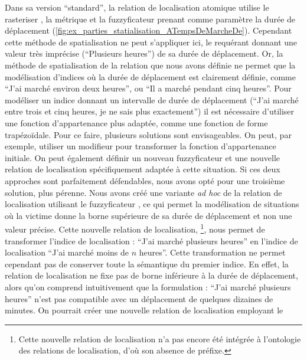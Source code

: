 Dans sa version \enquote{standard}, la relation de localisation
atomique  utilise le rasteriser
, la métrique  et la
fuzzyficateur  prenant comme paramètre la durée de
déplacement
(\autoref{fig:ex_parties_statialisation_ATempsDeMarcheDe}). Cependant
cette méthode de spatialisation ne peut s'appliquer ici, le requérant
donnant une valeur très imprécise (\ie \enquote{Plusieurs heures}) de
sa durée de déplacement. Or, la méthode de spatialisation de la
relation  que nous avons définie
ne permet que la modélisation d'indices où la durée de déplacement est
clairement définie, comme \enquote{J'ai marché environ deux heures},
ou \enquote{Il a marché pendant cinq heures}. Pour modéliser un indice
donnant un intervalle de durée de déplacement (\eg \enquote{J'ai
  marché entre trois et cinq heures, je ne sais plus exactement}) il
est nécessaire d'utiliser une fonction d'appartenance plus adaptée,
comme une fonction de forme trapézoïdale. Pour ce faire, plusieurs
solutions sont envisageables. On peut, par exemple, utiliser un
modifieur pour transformer la fonction d'appartenance initiale. On
peut également définir un nouveau fuzzyficateur et une nouvelle
relation de localisation spécifiquement adaptée à cette situation. Si
ces deux approches sont parfaitement défendables, nous avons opté pour
une troisième solution, plus pérenne.
%
Nous avons créé une variante \emph{ad hoc} de la relation de
localisation  utilisant le
fuzzyficateur , ce qui permet la modélisation de
situations où la victime donne la borne supérieure de sa durée de
déplacement et non une valeur précise. Cette nouvelle relation de
localisation,  \footnote{Cette
  nouvelle relation de localisation n'a pas encore été intégrée à
  l'ontologie des relations de localisation, d'où son absence de
  préfixe.}, nous permet de transformer l'indice de localisation :
\enquote{J'ai marché plusieurs heures} en l'indice de localisation
\enquote{J'ai marché moins de \(n\) heures}. Cette transformation ne
permet cependant pas de conserver toute la sémantique du premier
indice. En effet, la relation de localisation
 ne fixe pas de borne inférieure
à la durée de déplacement, alors qu'on comprend intuitivement que la
formulation : \enquote{J'ai marché plusieurs heures} n'est pas
compatible avec un déplacement de quelques dizaines de minutes. On
pourrait créer une nouvelle relation de localisation employant le
